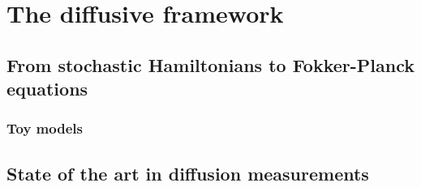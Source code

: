 
\chapter{The diffusive framework}\label{ch:the_diffusive_framework}

\section{From stochastic Hamiltonians to Fokker-Planck equations}

\subsection{Toy models}

\section{State of the art in diffusion measurements}